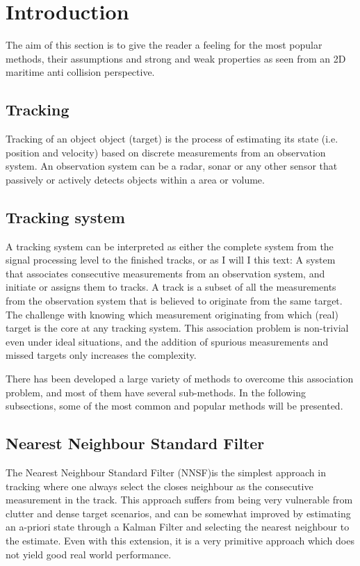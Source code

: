 \section{Introduction}
The aim of this section is to give the reader a feeling for the most popular methods, their assumptions and strong and weak properties as seen from an 2D maritime anti collision perspective.

\subsection{Tracking}
Tracking of an object object (target) is the process of estimating its state (i.e. position and velocity) based on discrete measurements from an observation system. An observation system can be a radar, sonar or any other sensor that passively or actively detects objects within a area or volume. 

\subsection{Tracking system}
A tracking system can be interpreted as either the complete system from the signal processing level to the finished tracks, or as I will I this text: A system that associates consecutive measurements from an observation system, and initiate or assigns them to tracks. A track is a subset of all the measurements from the observation system that is believed to originate from the same target. The challenge with knowing which measurement originating from which (real) target is the core at any tracking system. This association problem is non-trivial even under ideal situations, and the addition of spurious measurements and missed targets only increases the complexity.

There has been developed a large variety of methods to overcome this association problem, and most of them have several sub-methods. In the following subsections, some of the most common and popular methods will be presented.

\subsection{Nearest Neighbour Standard Filter}
The Nearest Neighbour Standard Filter (NNSF)is the simplest approach in tracking where one always select the closes neighbour as the consecutive measurement in the track. This approach suffers from being very vulnerable from clutter and dense target scenarios, and can be somewhat improved by estimating an a-priori state through a Kalman Filter and selecting the nearest neighbour to the estimate. Even with this extension, it is a very primitive approach which does not yield good real world performance. %

